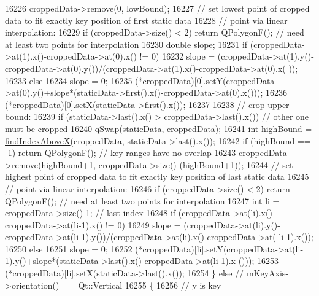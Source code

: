 \begin{DoxyCode}
16226     croppedData->remove(0, lowBound);
16227     \textcolor{comment}{// set lowest point of cropped data to fit exactly key position of first static data}
16228     \textcolor{comment}{// point via linear interpolation:}
16229     \textcolor{keywordflow}{if} (croppedData->size() < 2) \textcolor{keywordflow}{return} QPolygonF(); \textcolor{comment}{// need at least two points for interpolation}
16230     \textcolor{keywordtype}{double} slope;
16231     \textcolor{keywordflow}{if} (croppedData->at(1).x()-croppedData->at(0).x() != 0)
16232       slope = (croppedData->at(1).y()-croppedData->at(0).y())/(croppedData->at(1).x()-croppedData->at(0).x(
      ));
16233     \textcolor{keywordflow}{else}
16234       slope = 0;
16235     (*croppedData)[0].setY(croppedData->at(0).y()+slope*(staticData->first().x()-croppedData->at(0).x()));
16236     (*croppedData)[0].setX(staticData->first().x());
16237     
16238     \textcolor{comment}{// crop upper bound:}
16239     \textcolor{keywordflow}{if} (staticData->last().x() > croppedData->last().x()) \textcolor{comment}{// other one must be cropped}
16240       qSwap(staticData, croppedData);
16241     \textcolor{keywordtype}{int} highBound = \hyperlink{class_q_c_p_graph_abab2a75b5e63630432bdd1f3b57f07fa}{findIndexAboveX}(croppedData, staticData->last().x());
16242     \textcolor{keywordflow}{if} (highBound == -1) \textcolor{keywordflow}{return} QPolygonF(); \textcolor{comment}{// key ranges have no overlap}
16243     croppedData->remove(highBound+1, croppedData->size()-(highBound+1));
16244     \textcolor{comment}{// set highest point of cropped data to fit exactly key position of last static data}
16245     \textcolor{comment}{// point via linear interpolation:}
16246     \textcolor{keywordflow}{if} (croppedData->size() < 2) \textcolor{keywordflow}{return} QPolygonF(); \textcolor{comment}{// need at least two points for interpolation}
16247     \textcolor{keywordtype}{int} li = croppedData->size()-1; \textcolor{comment}{// last index}
16248     \textcolor{keywordflow}{if} (croppedData->at(li).x()-croppedData->at(li-1).x() != 0)
16249       slope = (croppedData->at(li).y()-croppedData->at(li-1).y())/(croppedData->at(li).x()-croppedData->at(
      li-1).x());
16250     \textcolor{keywordflow}{else}
16251       slope = 0;
16252     (*croppedData)[li].setY(croppedData->at(li-1).y()+slope*(staticData->last().x()-croppedData->at(li-1).x
      ()));
16253     (*croppedData)[li].setX(staticData->last().x());
16254   \} \textcolor{keywordflow}{else} \textcolor{comment}{// mKeyAxis->orientation() == Qt::Vertical}
16255   \{
16256     \textcolor{comment}{// y is key}

\end{DoxyCode}

